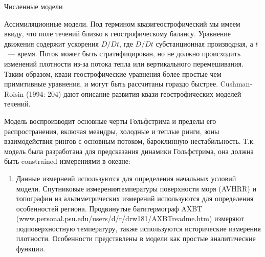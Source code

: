 \begin{chapter}{Численные модели}
\begin{section}{Ассимиляционные модели.}
Под термином квазигеострофический мы имеем ввиду, что поле течений
близко к геострофическому балансу. Уравнение движения содержит
ускорения $D/Dt$, где $D/Dt$ субстанционная производная, а $t$~---
время. Поток может быть стратифицирован, но не должно происходить
изменений плотности из-за потока тепла или вертикального
перемешивания. Таким образом, квази-геострофические уравнения более
простые чем примитивные уравнения, и могут быть рассчитаны гораздо
быстрее. Cushman-Roisin (1994: 204) дают описание развития
квази-геострофических моделей течений.
%

Модель воспроизводит основные черты Гольфстрима и пределы его
распространения, включая меандры, холодные и теплые ринги, зоны
взаимодействия рингов с основным потоком, бароклинную
нестабильность. Т.к. модель была разработана для предсказания динамики
Гольфстрима, она должна быть constrained измерениями в океане:
%
\begin{enumerate}
\item
Данные измернеий используются для определения начальных условий
модели. Спутниковые измерениятемпературы поверхности моря (AVHRR) и
топографии из альтиметрических измерений используются для определения
особенностей региона. Продвинутые батитермограф AXBT
(www.personal.psu.edu/users/d/r/drw181/AXBTreadme.htm) измеряют
подповерхностную температуру, также используются исторические
измерения плотности. Особенности представлены в модели как простые
аналитические функции.
%


\end{enumerate}
\end{section}
\end{chapter}
